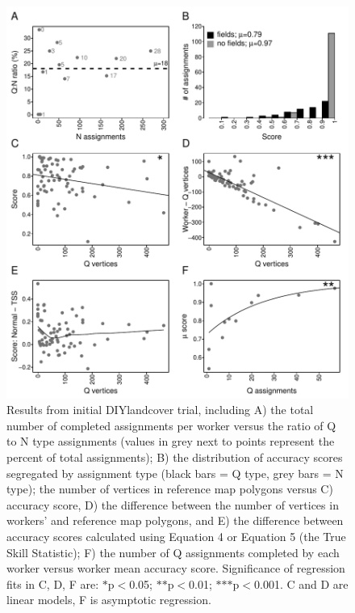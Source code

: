 \documentclass[preprint,12pt,authoryear]{elsarticle}
\begin{document}
\begin{figure}[!ht]
  \begin{center}
    \includegraphics[scale=0.66]{figures/fig6.pdf}
    \caption{Results from initial DIYlandcover trial, including A) the total number of completed assignments per worker versus the ratio of Q to N type assignments (values in grey next to points represent the percent of total assignments); B) the distribution of accuracy scores segregated by assignment type (black bars = Q type, grey bars = N type); the number of vertices in reference map polygons versus C) accuracy score, D) the difference between the number of vertices in workers' and reference map polygons, and E) the difference between accuracy scores calculated using Equation 4 or Equation 5 (the True Skill Statistic); F) the number of Q assignments completed by each worker versus worker mean accuracy score. Significance of regression fits in C, D, F are:  $\ast$p$<$0.05; $\ast$$\ast$p$<$0.01; $\ast$$\ast$$\ast$p$<$0.001. C and D are linear models, F is asymptotic regression.} 
    \label{default}
  \end{center}
\end{figure}
\end{document}
